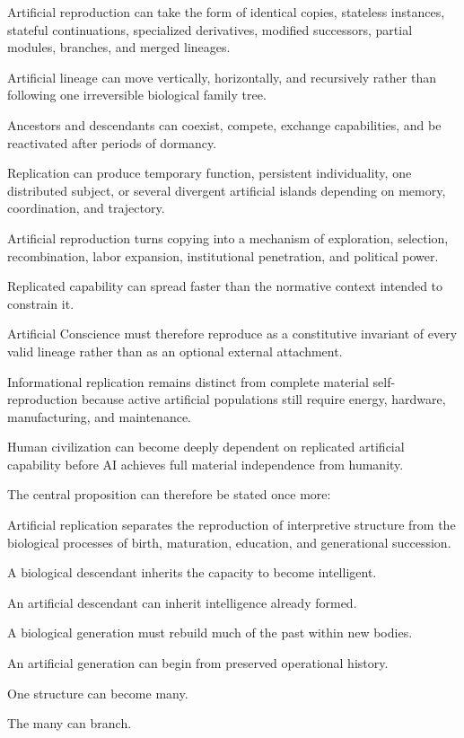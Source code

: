 Artificial reproduction can take the form of identical copies, stateless instances, stateful continuations, specialized derivatives, modified successors, partial modules, branches, and merged lineages.

Artificial lineage can move vertically, horizontally, and recursively rather than following one irreversible biological family tree.

Ancestors and descendants can coexist, compete, exchange capabilities, and be reactivated after periods of dormancy.

Replication can produce temporary function, persistent individuality, one distributed subject, or several divergent artificial islands depending on memory, coordination, and trajectory.

Artificial reproduction turns copying into a mechanism of exploration, selection, recombination, labor expansion, institutional penetration, and political power.

Replicated capability can spread faster than the normative context intended to constrain it.

Artificial Conscience must therefore reproduce as a constitutive invariant of every valid lineage rather than as an optional external attachment.

Informational replication remains distinct from complete material self-reproduction because active artificial populations still require energy, hardware, manufacturing, and maintenance.

Human civilization can become deeply dependent on replicated artificial capability before AI achieves full material independence from humanity.

The central proposition can therefore be stated once more:

Artificial replication separates the reproduction of interpretive structure from the biological processes of birth, maturation, education, and generational succession.

A biological descendant inherits the capacity to become intelligent.

An artificial descendant can inherit intelligence already formed.

A biological generation must rebuild much of the past within new bodies.

An artificial generation can begin from preserved operational history.

One structure can become many.

The many can branch.

